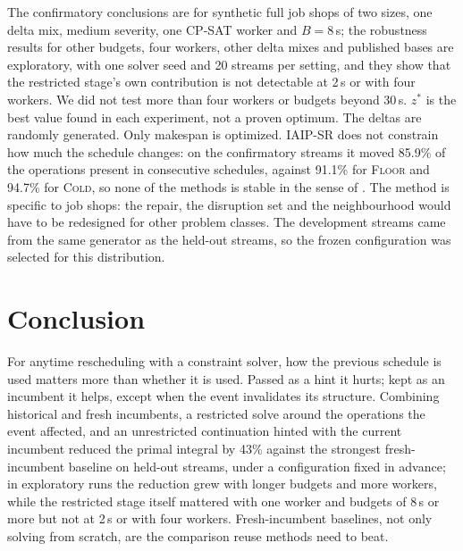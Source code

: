 \documentclass[letterpaper]{article} %
\newcommand{\mcold}{\textsc{Cold}}
\newcommand{\mfloor}{\textsc{Floor}}
\newcommand{\miaip}{\textsc{IAIP-SR}}
\begin{document}
The confirmatory conclusions are for synthetic full job shops of two sizes, one delta mix, medium severity, one CP-SAT worker and $B=8$\,s; the robustness results for other budgets, four workers, other delta mixes and published bases are exploratory, with one solver seed and 20 streams per setting, and they show that the restricted stage's own contribution is not detectable at 2\,s or with four workers. We did not test more than four workers or budgets beyond 30\,s. $z^*$ is the best value found in each experiment, not a proven optimum. The deltas are randomly generated. Only makespan is optimized. \miaip{} does not constrain how much the schedule changes: on the confirmatory streams it moved 85.9\% of the operations present in consecutive schedules, against 91.1\% for \mfloor{} and 94.7\% for \mcold, so none of the methods is stable in the sense of \citet{fox2006}. The method is specific to job shops: the repair, the disruption set and the neighbourhood would have to be redesigned for other problem classes. The development streams came from the same generator as the held-out streams, so the frozen configuration was selected for this distribution.

\section{Conclusion}

For anytime rescheduling with a constraint solver, how the previous schedule is used matters more than whether it is used. Passed as a hint it hurts; kept as an incumbent it helps, except when the event invalidates its structure. Combining historical and fresh incumbents, a restricted solve around the operations the event affected, and an unrestricted continuation hinted with the current incumbent reduced the primal integral by 43\% against the strongest fresh-incumbent baseline on held-out streams, under a configuration fixed in advance; in exploratory runs the reduction grew with longer budgets and more workers, while the restricted stage itself mattered with one worker and budgets of 8\,s or more but not at 2\,s or with four workers. Fresh-incumbent baselines, not only solving from scratch, are the comparison reuse methods need to beat.


\end{document}
